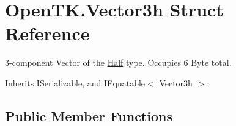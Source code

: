 \hypertarget{struct_open_t_k_1_1_vector3h}{\section{Open\-T\-K.\-Vector3h Struct Reference}
\label{struct_open_t_k_1_1_vector3h}
}


3-\/component Vector of the \hyperlink{struct_open_t_k_1_1_half}{Half} type. Occupies 6 Byte total.  




Inherits I\-Serializable, and I\-Equatable$<$ Vector3h $>$.

\subsection*{Public Member Functions}
